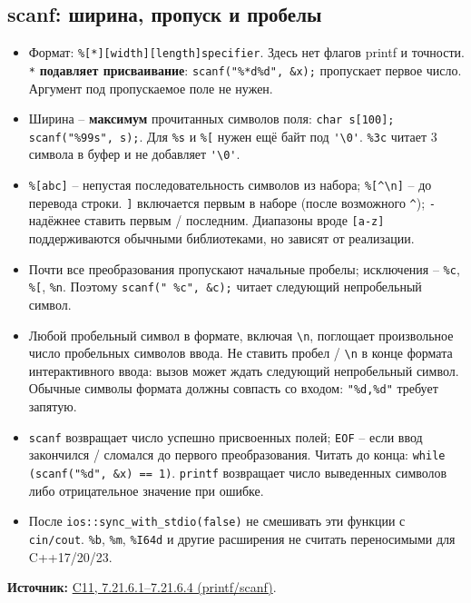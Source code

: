 \subsection{scanf: ширина, пропуск и пробелы}
\begin{itemize}[leftmargin=*, nosep]
\item Формат: \verb|%[*][width][length]specifier|. Здесь нет флагов printf и точности. \verb|*| \textbf{подавляет присваивание}: \verb|scanf("%*d%d", &x);| пропускает первое число. Аргумент под пропускаемое поле не нужен.
\item Ширина -- \textbf{максимум} прочитанных символов поля: \verb|char s[100]; scanf("%99s", s);|. Для \verb|%s| и \verb|%[| нужен ещё байт под \verb|'\0'|. \verb|%3c| читает 3 символа в буфер и не добавляет \verb|'\0'|.
\item \verb|%[abc]| -- непустая последовательность символов из набора; \verb|%[^\n]| -- до перевода строки. \verb|]| включается первым в наборе (после возможного \verb|^|); \verb|-| надёжнее ставить первым / последним. Диапазоны вроде \verb|[a-z]| поддерживаются обычными библиотеками, но зависят от реализации.
\item Почти все преобразования пропускают начальные пробелы; исключения -- \verb|%c|, \verb|%[|, \verb|%n|. Поэтому \verb|scanf(" %c", &c);| читает следующий непробельный символ.
\item Любой пробельный символ в формате, включая \verb|\n|, поглощает произвольное число пробельных символов ввода. Не ставить пробел / \verb|\n| в конце формата интерактивного ввода: вызов может ждать следующий непробельный символ. Обычные символы формата должны совпасть со входом: \verb|"%d,%d"| требует запятую.
\item \verb|scanf| возвращает число успешно присвоенных полей; \verb|EOF| -- если ввод закончился / сломался до первого преобразования. Читать до конца: \verb|while (scanf("%d", &x) == 1)|. \verb|printf| возвращает число выведенных символов либо отрицательное значение при ошибке.
\item После \verb|ios::sync_with_stdio(false)| не смешивать эти функции с \verb|cin/cout|. \verb|%b|, \verb|%m|, \verb|%I64d| и другие расширения не считать переносимыми для C++17/20/23.
\end{itemize}
\par \textbf{Источник:} \href{https://www.open-std.org/jtc1/sc22/wg14/www/docs/n1570.pdf}{C11, 7.21.6.1--7.21.6.4 (printf/scanf)}.
